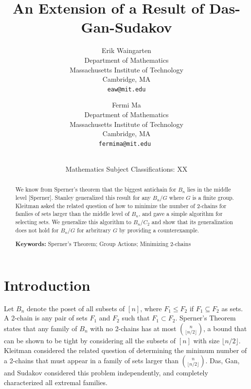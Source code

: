 \documentclass[12pt]{article}
\title{\bf An Extension of a Result of Das-Gan-Sudakov}
\author{Erik Waingarten\\
\small Department of Mathematics\\[-0.8ex]
\small Massachusetts Institute of Technology\\[-0.8ex] 
\small Cambridge, MA\\
\small\tt eaw@mit.edu\\
\and
Fermi Ma\\
\small Department of Mathematics\\[-0.8ex]
\small Massachusetts Institute of Technology\\[-0.8ex]
\small Cambridge, MA\\
\small\tt fermima@mit.edu
}
\date{\dateline{August, 2014}{XX}\\
\small Mathematics Subject Classifications: XX}
\theoremstyle{plain}
\theoremstyle{definition}
\theoremstyle{remark}
\begin{document}
\maketitle


\begin{abstract}
  We know from Sperner's theorem that the biggest antichain for $B_n$ lies in the middle level [Sperner]. Stanley generalized this result for any $B_n/G$ where $G$ is a finite group. Kleitman asked the related question of how to minimize the number of 2-chains for famlies of sets larger than the middle level of $B_n$, and gave a simple algorithm for selecting sets. We generalize this algorithm to $B_n/C_2$ and show that its generalization does not hold for $B_n/G$ for arbritrary $G$ by providing a counterexample.

  \bigskip\noindent \textbf{Keywords:} Sperner's Theorem; Group Actions; Minimizing 2-chains\end{abstract}

\section{Introduction}

Let $B_n$ denote the poset of all subsets of $[n]$, where $F_1 \leq F_2$ if $F_1 \subseteq F_2$ as sets. A 2-chain is any pair of sets $F_1$ and $F_2$ such that $F_1 \subset F_2$. Sperner's Theorem states that any family of $B_n$ with no 2-chains has at most $\binom{n}{\lfloor n/2 \rfloor}$, a bound that can be shown to be tight by considering all the subsets of $[n]$ with size $\lfloor n/2 \rfloor$. Kleitman considered the related question of determining the minimum number of a 2-chains that must appear in a family of sets larger than $\binom{n}{\lfloor n/2 \rfloor}$. Das, Gan, and Sudakov considered this problem independently, and completely characterized all extremal families.
\end{document}
